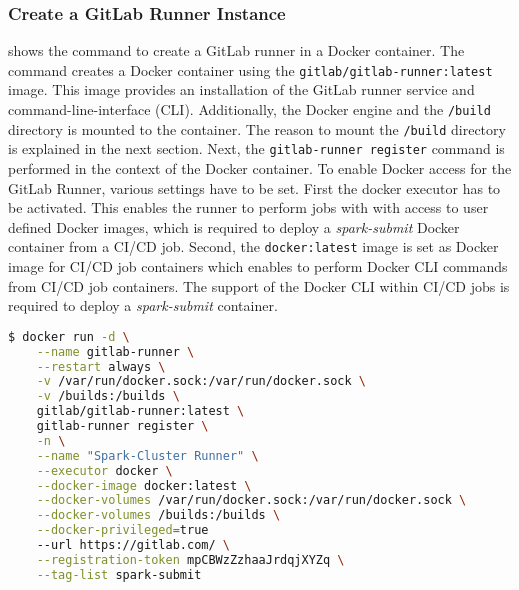 \subsubsection{Create a GitLab Runner Instance}
 shows the command to create a GitLab runner in a Docker container.
The command creates a Docker container using the \texttt{gitlab/gitlab-runner:latest} image. This image provides an installation of the GitLab runner service and command-line-interface (CLI). Additionally, the Docker engine and the \texttt{/build} directory is mounted to the container. The reason to mount the \texttt{/build} directory is explained in the next section.
Next, the \texttt{gitlab-runner register} command is performed in the context of the Docker container.
To enable Docker access for the GitLab Runner, various settings have to be set. First the docker executor has to be activated. This enables the runner to perform jobs with with access to user defined Docker images, which is required to deploy a \textit{spark-submit} Docker container from a CI/CD job. Second, the \texttt{docker:latest} image is set as Docker image for CI/CD job containers which enables to perform Docker CLI commands from CI/CD job containers.
%
The support of the Docker CLI within CI/CD jobs is required to deploy a \textit{spark-submit} container.
\begin{lstlisting}[label=lst:06_ci_runner_container_cmd, caption=CLI command to start a GitLab runner in a Docker container, language=bash, numbers=none]
$ docker run -d \
    --name gitlab-runner \
    --restart always \
    -v /var/run/docker.sock:/var/run/docker.sock \
    -v /builds:/builds \
    gitlab/gitlab-runner:latest \
    gitlab-runner register \
    -n \
    --name "Spark-Cluster Runner" \
    --executor docker \
    --docker-image docker:latest \
    --docker-volumes /var/run/docker.sock:/var/run/docker.sock \
    --docker-volumes /builds:/builds \
    --docker-privileged=true
    --url https://gitlab.com/ \
    --registration-token mpCBWzZzhaaJrdqjXYZq \
    --tag-list spark-submit
\end{lstlisting}


